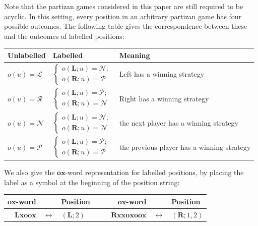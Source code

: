 \documentclass[11pt]{article}
\theoremstyle{definition}
\theoremstyle{plain}
\newcommand{\varP}{\mathcal{P}}
\newcommand{\varN}{\mathcal{N}}
\newcommand{\varL}{\mathcal{L}}
\newcommand{\varR}{\mathcal{R}}
\newcommand{\rmL}{\mathbf{L}}
\newcommand{\rmR}{\mathbf{R}}
\newcommand{\x}{\mathbf{x}}
\newcommand{\e}{\mathbf{o}}
\begin{document}
Note that the partizan games considered in this paper are still required to be acyclic.
In this setting, every position in an arbitrary partizan game has four possible outcomes. The following table gives the correspondence between these and the outcomes of labelled positions:

\begin{center}
    \begin{tabular}{|l|l|l|}
        \hline
        Unlabelled & Labelled & Meaning \\
        \hline
        $o(u)=\varL$ & $\begin{cases} o(\rmL; u)=\varN; \\ o(\rmR; u)=\varP \end{cases}$ & Left has a winning strategy  \\
        $o(u)=\varR$ & $\begin{cases} o(\rmL; u)=\varP; \\ o(\rmR; u)=\varN \end{cases}$ & Right has a winning strategy \\
        $o(u)=\varN$ & $\begin{cases} o(\rmL; u)=\varN; \\ o(\rmR; u)=\varN \end{cases}$ & the next player has a winning strategy \\
        $o(u)=\varP$ & $\begin{cases} o(\rmL; u)=\varP; \\ o(\rmR; u)=\varP \end{cases}$ & the previous player has a winning strategy \\
        \hline
    \end{tabular}
\end{center}

We also give the $\e\x$-word representation for labelled positions, by placing the label as a symbol at the beginning of the position string:
\begin{center}
    \begin{tabular}{|rcl|rcl|}
        \hline
        $\e\x$-word & & Position & $\e\x$-word & & Position \\
        \hline
        $\rmL\x\e\e\x$ & $\leftrightarrow$ & $(\rmL; 2)$  ~~&~~ $\rmR\x\x\e\x\e\e\x$ & $\leftrightarrow$ & $(\rmR; 1, 2)$ \\
        \hline
    \end{tabular}
\end{center}
\end{document}
